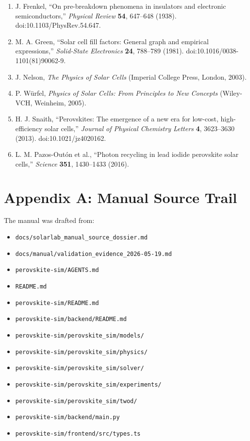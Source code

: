 \documentclass[
  11pt,
  american,
]{report}
\providecommand{\tightlist}{%
  \setlength{\itemsep}{0pt}\setlength{\parskip}{0pt}}
\begin{document}
\begin{enumerate}
{  IEEE} \textbf{55}, 2192--2193 (1967). doi:10.1109/PROC.1967.6123.
\item
  J. Frenkel, ``On pre-breakdown phenomena in insulators and electronic
  semiconductors,'' \emph{Physical Review} \textbf{54}, 647--648 (1938).
  doi:10.1103/PhysRev.54.647.
\item
  M. A. Green, ``Solar cell fill factors: General graph and empirical
  expressions,'' \emph{Solid-State Electronics} \textbf{24}, 788--789
  (1981). doi:10.1016/0038-1101(81)90062-9.
\item
  J. Nelson, \emph{The Physics of Solar Cells} (Imperial College Press,
  London, 2003).
\item
  P. Würfel, \emph{Physics of Solar Cells: From Principles to New
  Concepts} (Wiley-VCH, Weinheim, 2005).
\item
  H. J. Snaith, ``Perovskites: The emergence of a new era for low-cost,
  high-efficiency solar cells,'' \emph{Journal of Physical Chemistry
  Letters} \textbf{4}, 3623--3630 (2013). doi:10.1021/jz4020162.
\item
  L. M. Pazos-Outón et al., ``Photon recycling in lead iodide perovskite
  solar cells,'' \emph{Science} \textbf{351}, 1430--1433 (2016).
\end{enumerate}

\hypertarget{appendix-a-manual-source-trail}{%
\chapter{Appendix A: Manual Source
Trail}\label{appendix-a-manual-source-trail}}

The manual was drafted from:

\begin{itemize}
\tightlist
\item
  \texttt{docs/solarlab\_manual\_source\_dossier.md}
\item
  \texttt{docs/manual/validation\_evidence\_2026-05-19.md}
\item
  \texttt{perovskite-sim/AGENTS.md}
\item
  \texttt{README.md}
\item
  \texttt{perovskite-sim/README.md}
\item
  \texttt{perovskite-sim/backend/README.md}
\item
  \texttt{perovskite-sim/perovskite\_sim/models/}
\item
  \texttt{perovskite-sim/perovskite\_sim/physics/}
\item
  \texttt{perovskite-sim/perovskite\_sim/solver/}
\item
  \texttt{perovskite-sim/perovskite\_sim/experiments/}
\item
  \texttt{perovskite-sim/perovskite\_sim/twod/}
\item
  \texttt{perovskite-sim/backend/main.py}
\item
  \texttt{perovskite-sim/frontend/src/types.ts}
\end{itemize}
\end{document}
